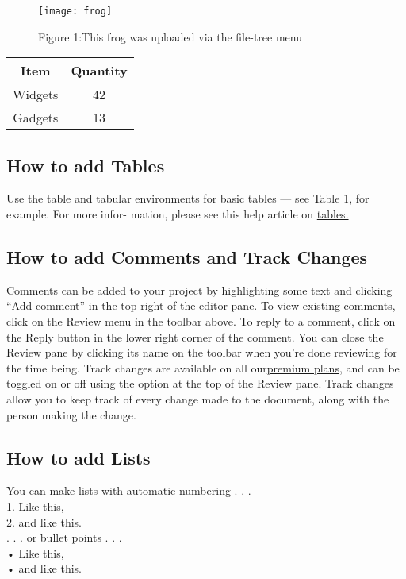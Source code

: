 \documentclass{article}
\begin{document}
\vspace{5mm} %



\begin{figure}
	\centering
	\texttt{[image: frog]}
	\caption{Figure 1:This frog was uploaded via the file-tree menu}
\end{figure}

\vspace{5mm} %


\begin{center}
	\begin{tabular}{ |c|c| } 
		\hline
		Item &Quantity \\ 
		\hline
		Widgets & 42 \\
		Gadgets & 13 \\
  
		\hline
	\end{tabular}
\end{center}

\subsection{How to add Tables}
Use the table and tabular environments for basic tables — see Table 1, for example. For more infor-
mation, please see this help article on \href{ https://www.overleaf.com/learn/latex/tables}{tables.}

\subsection{How to add Comments and Track Changes}
Comments can be added to your project by highlighting some text and clicking “Add comment” in
the top right of the editor pane. To view existing comments, click on the Review menu in the toolbar
above. To reply to a comment, click on the Reply button in the lower right corner of the comment.
You can close the Review pane by clicking its name on the toolbar when you’re done reviewing for the
time being.
Track changes are available on all our\href{https://www.overleaf.com/user/subscription/plans} {premium plans}, and can be toggled on or off using the option
at the top of the Review pane. Track changes allow you to keep track of every change made to the
document, along with the person making the change.

\subsection{How to add Lists}
You can make lists with automatic numbering . . .\\
1. Like this,\\
2. and like this.\\
. . . or bullet points . . .\\
• Like this,\\
• and like this.\\
\end{document}
